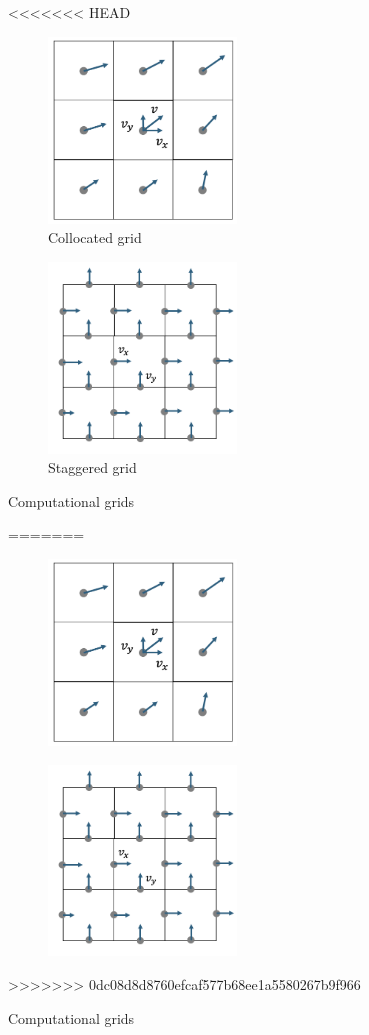 \documentclass[a4paper,12pt]{article}
\begin{document}
\begin{figure}[H]
<<<<<<< HEAD
\centering
\begin{subfigure}{.5\textwidth}
	\centering
	\includegraphics[width=5cm]{resources/collocated_grid_2.png}
	\caption{Collocated grid}
\end{subfigure}%
\begin{subfigure}{.5\textwidth}
	\centering
	\includegraphics[width=5cm]{resources/staggered_grid_2.png}
	\caption{Staggered grid}
\end{subfigure}
\caption{Computational grids}
\label{fig:grids}
=======
    \centering
    \begin{subfigure}[t]{0.45\textwidth}
        \centering
		\includegraphics[width=5cm]{resources/collocated_grid_2.png}
    \end{subfigure}
    \hfill
    \begin{subfigure}[t]{0.45\textwidth}
        \centering
		\includegraphics[width=5cm]{resources/staggered_grid_2.png}
    \end{subfigure}
	\caption{Computational grids}
>>>>>>> 0dc08d8d8760efcaf577b68ee1a5580267b9f966
\end{figure}
\end{document}
